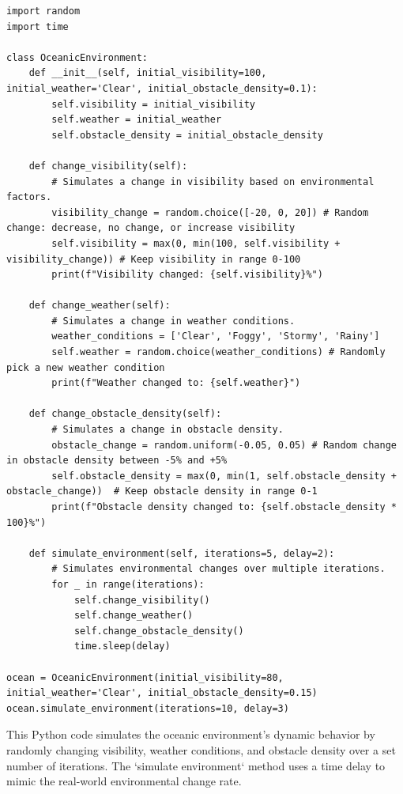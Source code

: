 \documentclass{article}
\begin{document}
\begin{verbatim}
import random
import time

class OceanicEnvironment:
    def __init__(self, initial_visibility=100, initial_weather='Clear', initial_obstacle_density=0.1):
        self.visibility = initial_visibility  
        self.weather = initial_weather 
        self.obstacle_density = initial_obstacle_density  

    def change_visibility(self):
        # Simulates a change in visibility based on environmental factors.
        visibility_change = random.choice([-20, 0, 20]) # Random change: decrease, no change, or increase visibility
        self.visibility = max(0, min(100, self.visibility + visibility_change)) # Keep visibility in range 0-100
        print(f"Visibility changed: {self.visibility}%")

    def change_weather(self):
        # Simulates a change in weather conditions.
        weather_conditions = ['Clear', 'Foggy', 'Stormy', 'Rainy']
        self.weather = random.choice(weather_conditions) # Randomly pick a new weather condition
        print(f"Weather changed to: {self.weather}")

    def change_obstacle_density(self):
        # Simulates a change in obstacle density.
        obstacle_change = random.uniform(-0.05, 0.05) # Random change in obstacle density between -5% and +5%
        self.obstacle_density = max(0, min(1, self.obstacle_density + obstacle_change))  # Keep obstacle density in range 0-1
        print(f"Obstacle density changed to: {self.obstacle_density * 100}%")

    def simulate_environment(self, iterations=5, delay=2):
        # Simulates environmental changes over multiple iterations.
        for _ in range(iterations):
            self.change_visibility()
            self.change_weather()
            self.change_obstacle_density()
            time.sleep(delay)  

ocean = OceanicEnvironment(initial_visibility=80, initial_weather='Clear', initial_obstacle_density=0.15)
ocean.simulate_environment(iterations=10, delay=3)
\end{verbatim}

This Python code simulates the oceanic environment's dynamic behavior by randomly changing visibility, weather conditions, and obstacle density over a set number of iterations. The `simulate environment` method uses a time delay to mimic the real-world environmental change rate.
\end{document}

